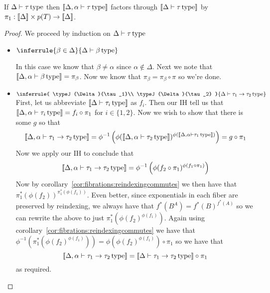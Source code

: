 \begin{lem}\label{lem:systemf:weakening}
  If $\Delta \vdash \tau\,\mathrm{type}$ then
  $\llbracket \Delta, \alpha \vdash \tau\,\mathrm{type} \rrbracket$ factors through
  $\llbracket \Delta \vdash \tau\,\mathrm{type} \rrbracket$ by
  $\pi_1 : \llbracket \Delta \rrbracket \times p(T) \to \llbracket \Delta \rrbracket$.
\end{lem}
\begin{proof}
  We proceed by induction on $\Delta \vdash \tau\,\mathrm{type}$
  \begin{itemize}
  \item
    $\inferrule{
      \beta \in \Delta
    }{\typeJ{\Delta}{\beta}}$

    In this case we know that $\beta \neq \alpha$ since
    $\alpha \not\in \Delta$. Next we note that
    $\llbracket \Delta, \alpha \vdash \beta\,\mathrm{type} \rrbracket = \pi_\beta$. Now we know
    that $\pi_\beta = \pi_\beta \circ \pi$ so we're done.
  \item
    $\inferrule{
      \typeJ{\Delta}{\tau_1}\\
      \typeJ{\Delta}{\tau_2}
    }{\typeJ{\Delta}{\tau_1 \to \tau_2}}$\\

    First, let us abbreviate $\llbracket \Delta \vdash \tau_i\,\mathrm{type} \rrbracket$ as
    $f_i$. Then our IH tell us that
    $\llbracket \Delta, \alpha \vdash \tau_i\,\mathrm{type} \rrbracket = f_i \circ \pi_1$ for
    $i \in \{1, 2\}$. Now we wish to show that there is some $g$ so
    that
    \[
      \llbracket \Delta, \alpha \vdash \tau_1 \to \tau_2\,\mathrm{type} \rrbracket =
      \phi^{-1}\left(\phi(\llbracket \Delta, \alpha \vdash \tau_2\,\mathrm{type} \rrbracket)^{\phi(\llbracket \Delta, \alpha \vdash \tau_1\,\mathrm{type} \rrbracket)}\right) =
      g \circ \pi_1
    \]
    Now we apply our IH to conclude that
    \[
      \llbracket \Delta, \alpha \vdash \tau_1 \to \tau_2\,\mathrm{type} \rrbracket =
      \phi^{-1}\left(\phi(f_2 \circ \pi_1)^{\phi(f_1 \circ \pi_1)}\right)
    \]
    Now by corollary~\ref{cor:fibrations:reindexingcommutes} we then
    have that $\pi_1^*(\phi(f_2))^{\pi_1^*(\phi(f_1))}$. Even better,
    since exponentials in each fiber are preserved by reindexing, we
    always have that $f^*(B^A) = f^*(B)^{f^*(A)}$ so we can rewrite
    the above to just
    $\pi_1^*\left(\phi(f_2)^{\phi(f_1)}\right)$. Again using
    corollary~\ref{cor:fibrations:reindexingcommutes} we have that
    $\phi^{-1}(\pi_1^*(\phi(f_2)^{\phi(f_1)})) =
    \phi(\phi(f_2)^{\phi(f_1)}) \circ \pi_1$ so we have that
    \[
      \llbracket \Delta, \alpha \vdash \tau_1 \to \tau_2\,\mathrm{type} \rrbracket =
      \llbracket \Delta \vdash \tau_1 \to \tau_2\,\mathrm{type} \rrbracket \circ \pi_1
    \]
    as required.
  \end{itemize}
\end{proof}

